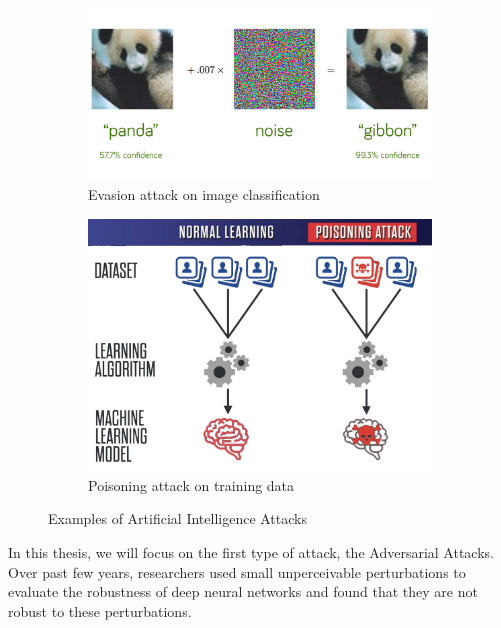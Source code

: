 \begin{figure}[H]
    \begin{subfigure}{0.45\textwidth}
      \includegraphics[width=\linewidth]{images/2_2_evasion.png}
      \caption{Evasion attack on image classification \cite{szegedy2013intriguing}} \label{fig:2_2_evasion}
    \end{subfigure}%
    \hspace*{\fill}   %
    \begin{subfigure}{0.45\textwidth}
      \includegraphics[width=\linewidth]{images/2_2_data_poisoning.png}
      \caption{Poisoning attack on training data \cite{Comiter2019AttackingAI}} \label{fig:2_2_data_poisoning}
    \end{subfigure}
  \caption{Examples of Artificial Intelligence Attacks} \label{fig:2_2_adversarial_attacks}
  \end{figure}

In this thesis, we will focus on the first type of attack, the Adversarial Attacks.
Over past few years, researchers \cite{goodfellow2014explaining, szegedy2013intriguing} used small unperceivable perturbations to evaluate the robustness of deep neural networks and found that they are not robust to these perturbations. 

